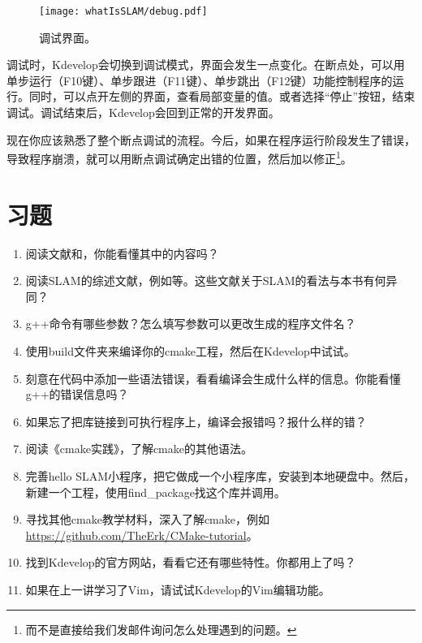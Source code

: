 \begin{figure}[!htp]
	\centering
	\texttt{[image: whatIsSLAM/debug.pdf]}
	\caption{调试界面。}
	\label{fig:debug}
\end{figure}

调试时，Kdevelop会切换到调试模式，界面会发生一点变化。在断点处，可以用单步运行（F10键）、单步跟进（F11键）、单步跳出（F12键）功能控制程序的运行。同时，可以点开左侧的界面，查看局部变量的值。或者选择“停止”按钮，结束调试。调试结束后，Kdevelop会回到正常的开发界面。

现在你应该熟悉了整个断点调试的流程。今后，如果在程序运行阶段发生了错误，导致程序崩溃，就可以用断点调试确定出错的位置，然后加以修正\footnote{而不是直接给我们发邮件询问怎么处理遇到的问题。}。%

\section*{习题}
\begin{enumerate}
	\item 阅读文献\cite{Liu2016}和\cite{Liang2013}，你能看懂其中的内容吗？
	\item[\optional] 阅读SLAM的综述文献，例如\cite{Cadena2016, Fuentes-Pacheco2015, Boal2014, Chen2012, Chen2007}等。这些文献关于SLAM的看法与本书有何异同？
	\item g++命令有哪些参数？怎么填写参数可以更改生成的程序文件名？
	\item 使用build文件夹来编译你的cmake工程，然后在Kdevelop中试试。
	\item 刻意在代码中添加一些语法错误，看看编译会生成什么样的信息。你能看懂g++的错误信息吗？
	\item 如果忘了把库链接到可执行程序上，编译会报错吗？报什么样的错？
	\item[\optional] 阅读《cmake实践》，了解cmake的其他语法。
	\clearpage
	\item[\optional] 完善hello SLAM小程序，把它做成一个小程序库，安装到本地硬盘中。然后，新建一个工程，使用find\_package找这个库并调用。
	\item[\optional] 寻找其他cmake教学材料，深入了解cmake，例如\url{https://github.com/TheErk/CMake-tutorial}。
	\item 找到Kdevelop的官方网站，看看它还有哪些特性。你都用上了吗？
	\item 如果在上一讲学习了Vim，请试试Kdevelop的Vim编辑功能。
\end{enumerate}